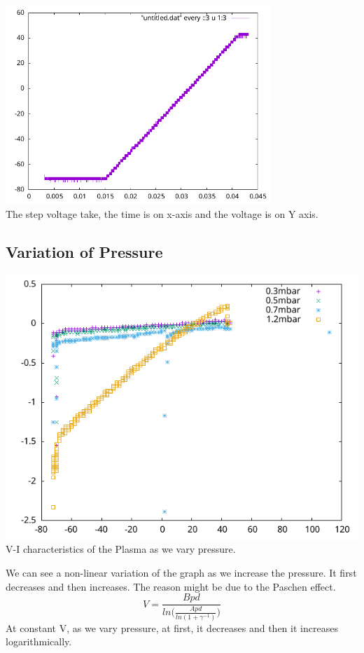 \documentclass[]{report}[12 pt]
\begin{document}
\begin{center}
	\includegraphics[width=10cm]{voltage}\\
	The step voltage take, the time is on x-axis and the voltage is on Y axis.
\end{center}
\subsection*{Variation of Pressure}
\begin{center}
	\includegraphics{variationpressure.png}\\
	V-I characteristics of the Plasma as we vary pressure.
\end{center}
We can see a non-linear variation of the graph as we increase the pressure. It first decreases and then increases. The reason might be due to the Paschen effect.
\[V = \frac{Bpd}{ln\bigg(\frac{Apd}{ln(1+\gamma^{-1})}\bigg)}\] 
At constant V, as we vary pressure, at first, it decreases and then it increases logarithmically.
\end{document}
